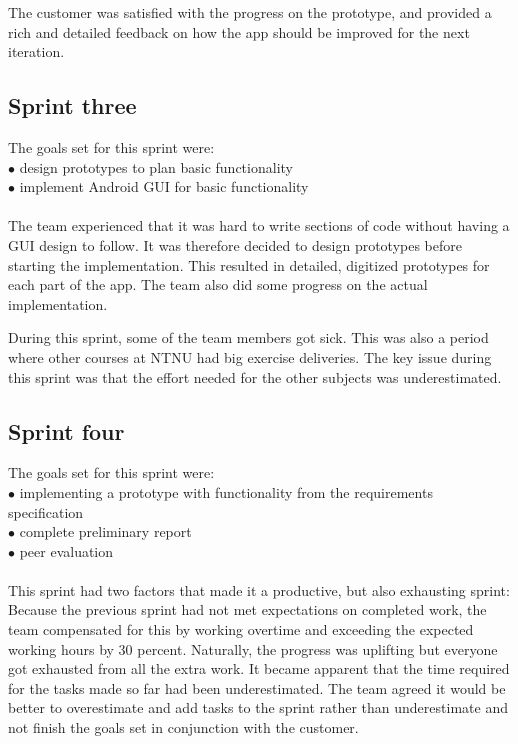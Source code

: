 The customer was satisfied with the progress on the prototype, and provided a rich and detailed feedback on how the app should be improved for the next iteration.

\subsection{Sprint three}
The goals set for this sprint were:\\
$\bullet$\hspace{0.25cm} design prototypes to plan basic functionality\\
$\bullet$\hspace{0.25cm} implement Android GUI for basic functionality\\\\
The team experienced that it was hard to write sections of code without having a GUI design to follow. It was therefore decided to design prototypes before starting the implementation. This resulted in detailed, digitized prototypes for each part of the app. The team also did some progress on the actual implementation.

During this sprint, some of the team members got sick. This was also a period where other courses at NTNU had big exercise deliveries. The key issue during this sprint was that the effort needed for the other subjects was underestimated. 

\subsection{Sprint four}
The goals set for this sprint were:\\
$\bullet$\hspace{0.25cm} implementing a prototype with functionality from the requirements specification\\
$\bullet$\hspace{0.25cm} complete preliminary report\\
$\bullet$\hspace{0.25cm} peer evaluation\\\\
This sprint had two factors that made it a productive, but also exhausting sprint: Because the previous sprint had not met expectations on completed work, the team compensated for this by working overtime and exceeding the expected working hours by 30 percent. Naturally, the progress was uplifting but everyone got exhausted from all the extra work. It became apparent that the time required for the tasks made so far had been underestimated. The team agreed it would be better to overestimate and add tasks to the sprint rather than underestimate and not finish the goals set in conjunction with the customer.


